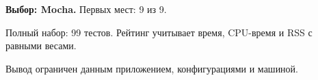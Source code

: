 \textbf{Выбор: Mocha.} Первых мест: 9 из 9.\par
\vspace{3mm}Полный набор: 99 тестов. Рейтинг учитывает время, CPU-время и RSS с равными весами.\par\vspace{3mm}Вывод ограничен данным приложением, конфигурациями и машиной.
